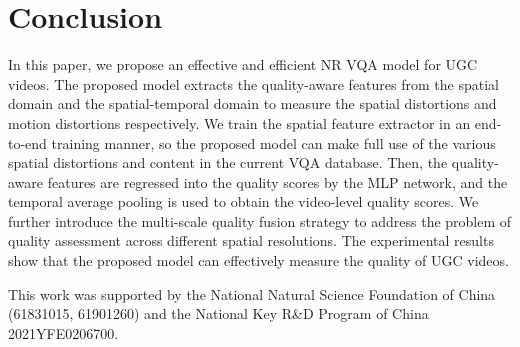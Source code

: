 \documentclass[sigconf]{acmart}
\begin{document}
\section{Conclusion}
In this paper, we propose an effective and efficient NR VQA model for UGC videos. The proposed model extracts the quality-aware features from the spatial domain and the spatial-temporal domain to measure the spatial distortions and motion distortions respectively. We train the spatial feature extractor in an end-to-end training manner, so the proposed model can make full use of the various spatial distortions and content in the current VQA database. Then, the quality-aware features are regressed into the quality scores by the MLP network, and the temporal average pooling is used to obtain the video-level quality scores. We further introduce the multi-scale quality fusion strategy to address the problem of quality assessment across different spatial resolutions. The experimental results show that the proposed model can effectively measure the quality of UGC videos.






\begin{acks}
This work was supported by the National Natural Science Foundation of China (61831015, 61901260) and the National Key R\&D Program of China 2021YFE0206700.
\end{acks}



\end{document}
